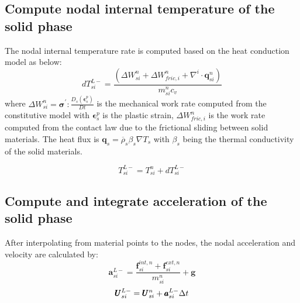 \documentclass[preprint,12pt]{elsarticle}
\begin{document}
\subsection{\textsf{Compute nodal internal temperature of the solid phase}}
%
%
The nodal internal temperature rate is computed based on the heat conduction model as below:
%
%
\begin{equation}
     dT_{si}^{L-} = \frac{(\Delta W_{si}^n + \Delta W_{fric,i}^n + \nabla^i \cdot \pmb{q}_{si}^n)}{m_{si}^n c_v}
\end {equation}
%
%
where $\Delta W_{si}^n = \pmb{\sigma}^\prime : \frac{D_s( \pmb{\epsilon}_s^p)}{Dt} $ is the mechanical work rate computed from the constitutive model with $\pmb{\epsilon}_s^p$ is the plastic strain, $ \Delta W_{fric,i}^n$ is the work rate computed from the contact law due to the frictional sliding between solid materials. The heat flux is $\pmb{q}_s = \overline{\rho}_s \beta_s \nabla T_s$ with $\beta_s$ being the thermal conductivity of the solid materials.

\begin{equation}
     T_{si}^{L-} = T_{si}^n + dT_{si}^{L-}
\end {equation}
%
%
\subsection{\textsf{Compute and integrate acceleration of the solid phase}}
After interpolating from material points to the nodes, the nodal acceleration and velocity are calculated by:
%
%
\begin{equation}
     \pmb{a}_{si}^{L-} = \frac{\pmb{f}_{si}^{int,n} + \pmb{f}_{si}^{ext,n}}{m_{si}^n} + \pmb{g}
\end {equation}
\begin{equation}
     \pmb{U}_{si}^{L-} = \pmb{U}_{si}^n + \pmb{a}_{si}^{L-} \Delta{t}
\end {equation}
%
%
\end{document}
